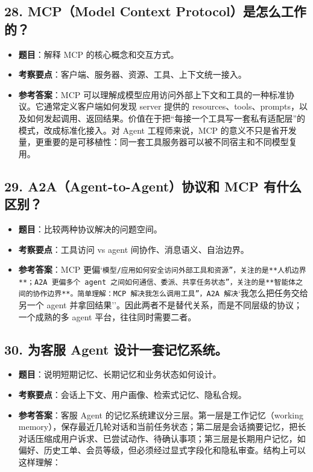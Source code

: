 \subsection{28. MCP（Model Context Protocol）是怎么工作的？}
\begin{itemize}[leftmargin=2em]
\item \textbf{题目}：解释 MCP 的核心概念和交互方式。
\item \textbf{考察要点}：客户端、服务器、资源、工具、上下文统一接入。
\item \textbf{参考答案}：MCP 可以理解成模型应用访问外部上下文和工具的一种标准协议。它通常定义客户端如何发现 server 提供的 resources、tools、prompts，以及如何发起调用、返回结果。价值在于把``每接一个工具写一套私有适配层''的模式，改成标准化接入。对 Agent 工程师来说，MCP 的意义不只是省开发量，更重要的是可移植性：同一套工具服务器可以被不同宿主和不同模型复用。
\end{itemize}

\subsection{29. A2A（Agent-to-Agent）协议和 MCP 有什么区别？}
\begin{itemize}[leftmargin=2em]
\item \textbf{题目}：比较两种协议解决的问题空间。
\item \textbf{考察要点}：工具访问 vs agent 间协作、消息语义、自治边界。
\item \textbf{参考答案}：MCP 更偏`\texttt{模型/应用如何安全访问外部工具和资源''，关注的是**人机边界**；A2A 更偏}\texttt{多个 agent 之间如何通信、委派、共享任务状态''，关注的是**智能体之间的协作边界**。简单理解：MCP 解决}\texttt{我怎么调用工具''，A2A 解决}`我怎么把任务交给另一个 agent 并拿回结果''。因此两者不是替代关系，而是不同层级的协议；一个成熟的多 agent 平台，往往同时需要二者。
\end{itemize}

\subsection{30. 为客服 Agent 设计一套记忆系统。}
\begin{itemize}[leftmargin=2em]
\item \textbf{题目}：说明短期记忆、长期记忆和业务状态如何设计。
\item \textbf{考察要点}：会话上下文、用户画像、检索式记忆、隐私合规。
\item \textbf{参考答案}：客服 Agent 的记忆系统建议分三层。第一层是工作记忆（working memory），保存最近几轮对话和当前任务状态；第二层是会话摘要记忆，把长对话压缩成用户诉求、已尝试动作、待确认事项；第三层是长期用户记忆，如偏好、历史工单、会员等级，但必须经过显式字段化和隐私审查。结构上可以这样理解：
\end{itemize}

